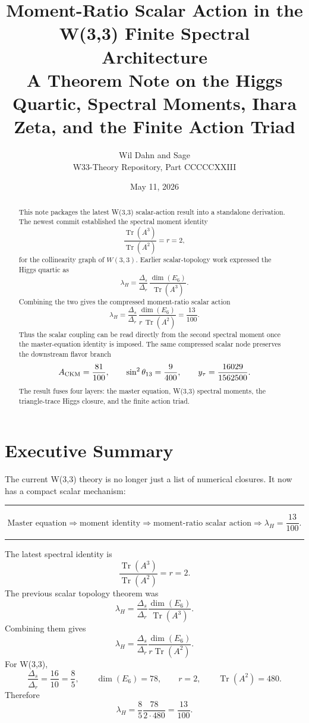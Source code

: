 \documentclass[11pt]{article}
\title{\textbf{Moment-Ratio Scalar Action in the W(3,3) Finite Spectral Architecture}\\[0.35em]
\large A Theorem Note on the Higgs Quartic, Spectral Moments, Ihara Zeta, and the Finite Action Triad}
\author{Wil Dahn and Sage\\\small W33-Theory Repository, Part CCCCCXXIII}
\date{May 11, 2026}
\theoremstyle{definition}
\newcommand{\Tr}{\operatorname{Tr}}
\newcommand{\lamH}{\lambda_H}
\newcommand{\Deltar}{\Delta_r}
\newcommand{\Deltas}{\Delta_s}
\newenvironment{keybox}{%
  \begin{center}\begin{minipage}{0.94\linewidth}\color{darkblue}\hrule\vspace{0.6em}
}{%
  \vspace{0.6em}\hrule\end{minipage}\end{center}
}
\begin{document}
\maketitle

\begin{abstract}
This note packages the latest W(3,3) scalar-action result into a standalone derivation.  The newest commit established the spectral moment identity
\[
  \frac{\Tr(A^3)}{\Tr(A^2)} = r = 2,
\]
for the collinearity graph of \(W(3,3)\).  Earlier scalar-topology work expressed the Higgs quartic as
\[
  \lamH = \frac{\Deltas}{\Deltar}\,\frac{\dim(E_6)}{\Tr(A^3)}.
\]
Combining the two gives the compressed moment-ratio scalar action
\[
  \boxed{\displaystyle
  \lamH = \frac{\Deltas}{\Deltar}\,\frac{\dim(E_6)}{r\,\Tr(A^2)} = \frac{13}{100}.}
\]
Thus the scalar coupling can be read directly from the second spectral moment once the master-equation identity is imposed.  The same compressed scalar node preserves the downstream flavor branch
\[
  A_{\rm CKM}=\frac{81}{100},\qquad
  \sin^2\theta_{13}=\frac{9}{400},\qquad
  y_\tau=\frac{16029}{1562500}.
\]
The result fuses four layers: the master equation, W(3,3) spectral moments, the triangle-trace Higgs closure, and the finite action triad.
\end{abstract}

\tableofcontents
\newpage

\section{Executive Summary}

The current W(3,3) theory is no longer just a list of numerical closures.  It now has a compact scalar mechanism:

\begin{keybox}
\[
\boxed{
\text{Master equation} \Rightarrow \text{moment identity} \Rightarrow
\text{moment-ratio scalar action} \Rightarrow \lamH = \frac{13}{100}.
}
\]
\end{keybox}

The latest spectral identity is
\[
  \frac{\Tr(A^3)}{\Tr(A^2)} = r = 2.
\]
The previous scalar topology theorem was
\[
  \lamH = \frac{\Deltas}{\Deltar}\frac{\dim(E_6)}{\Tr(A^3)}.
\]
Combining them gives
\[
  \lamH = \frac{\Deltas}{\Deltar}\frac{\dim(E_6)}{r\Tr(A^2)}.
\]
For W(3,3),
\[
  \frac{\Deltas}{\Deltar}=\frac{16}{10}=\frac85,
  \qquad \dim(E_6)=78,
  \qquad r=2,
  \qquad \Tr(A^2)=480.
\]
Therefore
\[
  \lamH = \frac85\frac{78}{2\cdot 480}=\frac{13}{100}.
\]
\end{document}
